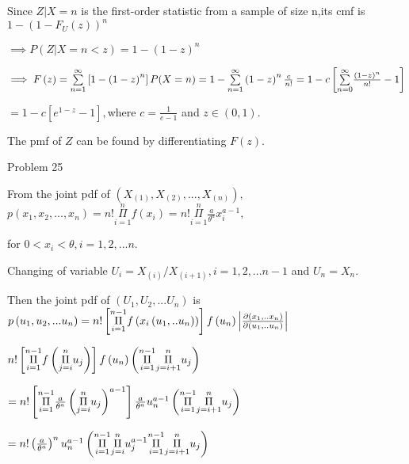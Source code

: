 \documentclass{article}
\begin{document}
Since $Z|X=n$ is the first-order statistic from a sample of size n,its cmf
is $1-\left( 1-F_{U}\left( z\right) \right) ^{n}$

$\implies P(Z|X=n<z)=1-\left( 1-z\right) ^{n}$

$\implies F\left( z\right) =\overset{\infty }{\underset{n=1}{\sum }}\left[
1-\left( 1-z\right) ^{n}\right] P(X=n)=1-\overset{\infty }{\underset{n=1}{%
\sum }}\left( 1-z\right) ^{n}\frac{c}{n!}=1-c\left[ \overset{\infty }{%
\underset{n=0}{\sum }}\frac{\left( 1-z\right) ^{n}}{n!}-1\right] $

$=1-c\left[ e^{1-z}-1\right] ,$where $c=\frac{1}{e-1}$ and $z\in \left(
0,1\right) .$

The pmf of $Z$ can be found by differentiating $F\left( z\right) .$

Problem 25

\bigskip From the joint pdf of $\left( X_{\left( 1\right) },X_{\left(
2\right) },...,X_{\left( n\right) }\right) ,$ $p\left(
x_{1},x_{2},...,x_{n}\right) =n!\underset{i=1}{\overset{n}{\Pi }}f\left(
x_{i}\right) =n!\underset{i=1}{\overset{n}{\Pi }}\frac{a}{\theta ^{a}}%
x_{i}^{a-1},$

for $0<x_{i}<\theta ,i=1,2,...n.$

Changing of variable $U_{i}=X_{\left( i\right) }/X_{\left( i+1\right)
},i=1,2,...n-1$ and $U_{n}=X_{n}.$

Then the joint pdf of $\left( U_{1},U_{2},...U_{n}\right) $ is $p\left(
u_{1},u_{2},...u_{n}\right) =n!\left[ \underset{i=1}{\overset{n-1}{\Pi }}%
f\left( x_{i}\left( u_{1},..u_{n}\right) \right) \right] f\left(
u_{n}\right) \left\vert \frac{\partial \left( x_{1},..x_{n}\right) }{%
\partial \left( u_{1},..u_{n}\right) }\right\vert $

$n!\left[ \underset{i=1}{\overset{n-1}{\Pi }}f\left( \underset{j=i}{\overset{%
n}{\Pi }}u_{j}\right) \right] f\left( u_{n}\right) \left( \underset{i=1}{%
\overset{n-1}{\Pi }}\underset{j=i+1}{\overset{n}{\Pi }}u_{j}\right) $

$=n!\left[ \underset{i=1}{\overset{n-1}{\Pi }}\frac{a}{\theta ^{a}}\left( 
\underset{j=i}{\overset{n}{\Pi }}u_{j}\right) ^{a-1}\right] \frac{a}{\theta
^{a}}u_{n}^{a-1}\left( \underset{i=1}{\overset{n-1}{\Pi }}\underset{j=i+1}{%
\overset{n}{\Pi }}u_{j}\right) $

$=n!\left( \frac{a}{\theta ^{a}}\right) ^{n}u_{n}^{a-1}\left( \underset{i=1}{%
\overset{n-1}{\Pi }}\underset{j=i}{\overset{n}{\Pi }}u_{j}^{a-1}\underset{i=1%
}{\overset{n-1}{\Pi }}\underset{j=i+1}{\overset{n}{\Pi }}u_{j}\right) $
\end{document}
